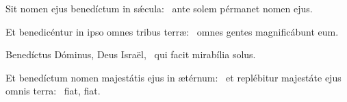 \item Sit nomen ejus benedíctum in sǽcula:~\psstar{} ante solem pérmanet nomen ejus.

\item Et benedicéntur in ipso omnes tribus terræ:~\psstar{} omnes gentes magnificábunt eum.

\item Benedíctus Dóminus, Deus Israël,~\psstar{} qui facit mirabília solus.

\item Et benedíctum nomen majestátis ejus in ætérnum:~\pscross{} et replébitur majestáte ejus omnis terra:~\psstar{} fiat, fiat.

